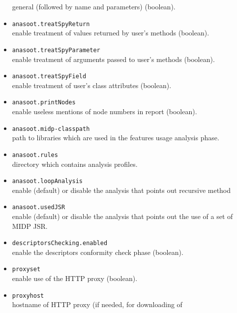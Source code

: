 \begin{itemize}
  general (followed by name and parameters) (boolean).
\item{\texttt{anasoot.treatSpyReturn}}\\ enable treatment of values returned by
  user's methods (boolean).
\item{\texttt{anasoot.treatSpyParameter}}\\ enable treatment of arguments passed
  to user's methods (boolean).
\item{\texttt{anasoot.treatSpyField}}\\ enable treatment of user's class
  attributes (boolean).
\item{\texttt{anasoot.printNodes}}\\ enable useless mentions of node numbers in
  report (boolean).
\item{\texttt{anasoot.midp-classpath}}\\ path to libraries which are used in the
  features usage analysis phase.
\item{\texttt{anasoot.rules}}\\ directory which contains analysis profiles.
\item{\texttt{anasoot.loopAnalysis}}\\ enable (default) or disable the analysis
that points out recursive method
\item{\texttt{anasoot.usedJSR}}\\ enable (default) or disable the analysis
that points out the use of a set of MIDP JSR. 
\item{\texttt{descriptorsChecking.enabled}}\\ enable the descriptors conformity check phase (boolean).
\item{\texttt{proxyset}}\\ enable use of the HTTP proxy (boolean).
\item{\texttt{proxyhost}}\\ hostname of HTTP proxy (if needed, for downloading of

\end{itemize}
